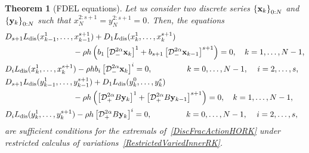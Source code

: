 \documentclass[a4paper,10pt,reqno]{amsart}
\newtheorem{theorem}{Theorem}[section]
\newtheorem{remark}{Remark}[section]
\theoremstyle{definition}
\newcommand{\R}{\mathbb{R}}      %
\newcommand{\dis}{\text{dis}}
\begin{document}
\begin{theorem}[FDEL equations]\label{thm:maintheorem}
Let us consider two discrete series $\left\{{\bf x}_k\right\}_{0:N}$ and $\left\{{\bf y}_k\right\}_{0:N}$ such that $x_N^{2:s+1}=y_N^{2:s+1}=0$. Then, the equations
\begin{subequations}\label{FinalRK}
\begin{align}
&D_{s+1}L_\dis(x_{k-1}^{1},\ldots,x_{k-1}^{s+1})+ D_1L_\dis(x_k^1,\ldots,x_k^{s+1})\nonumber\\
&\hspace{3cm}-\rho h\left(b_1\left[\mathcal{D}^{2\alpha}_{-}{\bf x}_k\right]^1 +b_{s+1}\left[ \mathcal{D}^{2\alpha}_{-}{\bf x}_{k-1}\right]^{s+1}\right)=0,\quad  k=1,\ldots, N-1,\label{FinalRK1}\\
&D_iL_\dis(x_k^1,\ldots,x_k^{s+1})-\rho h b_i \left[\mathcal{D}^{2\alpha}_{-}{\bf x}_k\right]^i=0,\,\hspace{1cm}\,\,\quad k=0,\ldots, N-1,\,\quad i=2,\ldots,s,\label{FinalRKi}\\
&D_{s+1}L_\dis(y_{k-1}^{1},\ldots,y_{k-1}^{s+1})+ D_1L_\dis(y_k^0,\ldots,y_k^s)\nonumber\\
&\hspace{3cm}-\rho h\left(\left[\mathcal{D}^{2\alpha}_{+}B{\bf  y}_k\right]^1 +\left[\mathcal{D}^{2\alpha}_{+}B{\bf  y}_{k-1}\right]^{s+1}\right)=0,\quad  k=1,\ldots, N-1,\label{FinalRKy1}\\
&D_iL_\dis(y_k^{1},\ldots,y_k^{s+1})-\rho h \left[\mathcal{D}^{2\alpha}_{+}B{\bf y}_k\right]^i=0,\,\hspace{1cm}\,\,\quad k=0,\ldots, N-1,\,\quad i=2,\ldots,s,\label{FinalRKyi}
\end{align}
\end{subequations}
 are sufficient conditions for the extremals of~\eqref{DiscFracActionHORK} under restricted calculus of variations~\eqref{RestrictedVariedInnerRK}.
\end{theorem}
\end{document}
